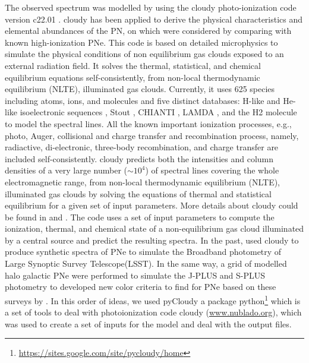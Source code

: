 \documentclass[fleqn,usenatbib]{mnras}
\begin{document}
The observed spectrum was modelled by using the {\sc cloudy}
photo-ionization code version c22.01 \citep{Ferland:2017}. {\sc cloudy}
has been applied to derive the physical characteristics and elemental
abundances of the PN, on which were considered by comparing with known
high-ionization PNe. This code is based on detailed microphysics to
simulate the physical conditions of non equilibrium gas clouds exposed to
an external radiation field. It solves the thermal, statistical, and chemical
equilibrium equations self-consistently, from non-local thermodynamic
equilibrium (NLTE), illuminated gas clouds. Currently, it uses 625
species including atoms, ions, and molecules and five distinct
databases: H-like and He-like isoelectronic sequences \citep{Porter:2012},
Stout \citep{Lykins:2015}, CHIANTI \citep{Landi:2012},
LAMDA \citep{Schoier:2005}, and the H2 molecule
\citep{Shaw:2005} to model the spectral lines. All the known
important ionization processes, e.g., photo, Auger, collisional
and charge transfer and recombination process, namely,
radiactive, di-electronic, three-body recombination, and charge
transfer are included self-consistently. {\sc cloudy} predicts both
the intensities and column densities of a very large number
($\sim 10^{4}$) of spectral lines covering the whole electromagnetic
range, from non-local thermodynamic equilibrium (NLTE),
illuminated gas clouds by solving the equations of thermal and
statistical equilibrium for a given set of input parameters. More
details about {\sc cloudy} could be found in \citet{Ferland:2013}
and \citet{Pandey:2022a}. The code uses a set of input parameters to compute the
ionization, thermal, and chemical state of a non-equilibrium gas cloud
illuminated by a central source and predict the resulting spectra. 
In the past, \citet{Vejar:2019} used {\sc cloudy} to produce
synthetic spectra of PNe to simulate the Broadband photometry
of Large Synoptic Survey Telescope(LSST). In the same way, a grid of modelled
halo galactic PNe were performed to simulate the J-PLUS and S-PLUS photometry
to developed new color criteria to find for PNe based on these surveys
by \citet{Gutierrez-Soto:2020}.
In this order of ideas, we used {\sc pyCloudy} \citep{Morisset:2013} a
package python\footnote{\url{https://sites.google.com/site/pycloudy/home}} which
is a set of tools to deal with photoionization code {\sc cloudy} (\url{www.nublado.org}),
which was used to create a set of inputs for the model and deal with the output files.
\end{document}
